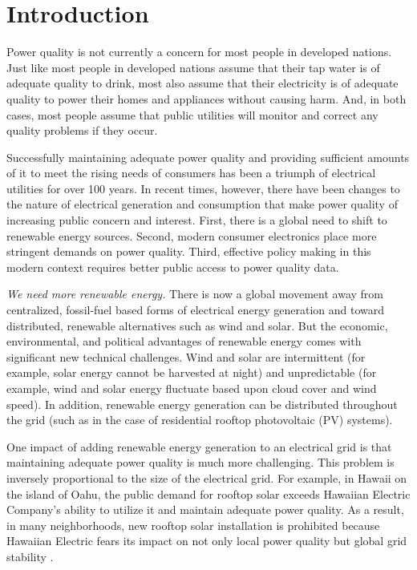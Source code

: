 \section{Introduction}


Power quality is not currently a concern for most people in developed nations. Just like most people in developed nations assume that their tap water is of adequate quality to drink, most also assume that their electricity is of adequate quality to power their homes and appliances without causing harm. And, in both cases, most people assume that public utilities will monitor and correct any quality problems if they occur.

Successfully maintaining adequate power quality and providing sufficient amounts of it to meet the rising needs of consumers has been a triumph of electrical utilities for over 100 years. In recent times, however, there have been changes to the nature of electrical generation and consumption that make power quality of increasing public concern and interest. First, there is a global need to shift to renewable energy sources. Second, modern consumer electronics place more stringent demands on power quality.  Third, effective policy making in this modern context requires better public access to power quality data.

{\em We need more renewable energy.} There is now a global movement away from centralized, fossil-fuel based forms of electrical energy generation and toward distributed, renewable alternatives such as wind and solar. But the economic, environmental, and political advantages of renewable energy comes with significant new technical challenges. Wind and solar are intermittent (for example, solar energy cannot be harvested at night) and unpredictable (for example, wind and solar energy fluctuate based upon cloud cover and wind speed). In addition, renewable energy generation can be distributed throughout the grid (such as in the case of residential rooftop photovoltaic (PV) systems).

One impact of adding renewable energy generation to an electrical grid is that maintaining adequate power quality is much more challenging. This problem is inversely proportional to the size of the electrical grid. For example, in Hawaii on the island of Oahu, the public demand for rooftop solar exceeds Hawaiian Electric Company's ability to utilize it and maintain adequate power quality. As a result, in many neighborhoods, new rooftop solar installation is prohibited because Hawaiian Electric fears its impact on not only local power quality but global grid stability \cite{TBD}.

